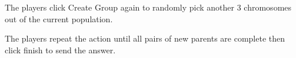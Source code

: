 \documentclass[12pt,oneside,openright,a4paper]{cpe-english-project}
\begin{document}
\begin{itemize}
\begin{enumerate}
		The players click Create Group again to randomly pick another 3 chromosomes out of the current population. \\
		\begin{minipage}[c]{\textwidth}\centering {}  \end{minipage}
		The players repeat the action until all pairs of new parents are complete then click finish to send the answer. \\


\end{enumerate}
\end{itemize}
\end{document}
